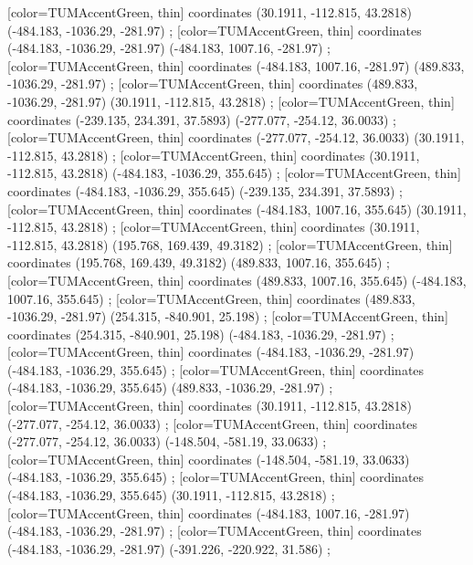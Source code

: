         [color=TUMAccentGreen, thin] coordinates { (30.1911, -112.815, 43.2818) (-484.183, -1036.29, -281.97) };
        [color=TUMAccentGreen, thin] coordinates { (-484.183, -1036.29, -281.97) (-484.183, 1007.16, -281.97) };
        [color=TUMAccentGreen, thin] coordinates { (-484.183, 1007.16, -281.97) (489.833, -1036.29, -281.97) };
        [color=TUMAccentGreen, thin] coordinates { (489.833, -1036.29, -281.97) (30.1911, -112.815, 43.2818) };
        [color=TUMAccentGreen, thin] coordinates { (-239.135, 234.391, 37.5893) (-277.077, -254.12, 36.0033) };
        [color=TUMAccentGreen, thin] coordinates { (-277.077, -254.12, 36.0033) (30.1911, -112.815, 43.2818) };
        [color=TUMAccentGreen, thin] coordinates { (30.1911, -112.815, 43.2818) (-484.183, -1036.29, 355.645) };
        [color=TUMAccentGreen, thin] coordinates { (-484.183, -1036.29, 355.645) (-239.135, 234.391, 37.5893) };
        [color=TUMAccentGreen, thin] coordinates { (-484.183, 1007.16, 355.645) (30.1911, -112.815, 43.2818) };
        [color=TUMAccentGreen, thin] coordinates { (30.1911, -112.815, 43.2818) (195.768, 169.439, 49.3182) };
        [color=TUMAccentGreen, thin] coordinates { (195.768, 169.439, 49.3182) (489.833, 1007.16, 355.645) };
        [color=TUMAccentGreen, thin] coordinates { (489.833, 1007.16, 355.645) (-484.183, 1007.16, 355.645) };
        [color=TUMAccentGreen, thin] coordinates { (489.833, -1036.29, -281.97) (254.315, -840.901, 25.198) };
        [color=TUMAccentGreen, thin] coordinates { (254.315, -840.901, 25.198) (-484.183, -1036.29, -281.97) };
        [color=TUMAccentGreen, thin] coordinates { (-484.183, -1036.29, -281.97) (-484.183, -1036.29, 355.645) };
        [color=TUMAccentGreen, thin] coordinates { (-484.183, -1036.29, 355.645) (489.833, -1036.29, -281.97) };
        [color=TUMAccentGreen, thin] coordinates { (30.1911, -112.815, 43.2818) (-277.077, -254.12, 36.0033) };
        [color=TUMAccentGreen, thin] coordinates { (-277.077, -254.12, 36.0033) (-148.504, -581.19, 33.0633) };
        [color=TUMAccentGreen, thin] coordinates { (-148.504, -581.19, 33.0633) (-484.183, -1036.29, 355.645) };
        [color=TUMAccentGreen, thin] coordinates { (-484.183, -1036.29, 355.645) (30.1911, -112.815, 43.2818) };
        [color=TUMAccentGreen, thin] coordinates { (-484.183, 1007.16, -281.97) (-484.183, -1036.29, -281.97) };
        [color=TUMAccentGreen, thin] coordinates { (-484.183, -1036.29, -281.97) (-391.226, -220.922, 31.586) };
